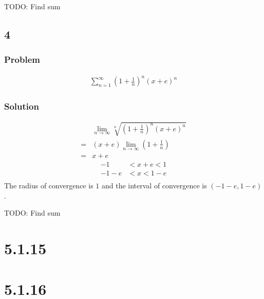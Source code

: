\documentclass[12pt]{article}
\newcommand{\round}[1]{\left(       #1 \right)      }
\begin{document}
TODO: Find sum


\subsection*{4}
\subsubsection*{Problem}
\begin{align*}
    \sum_{n=1}^\infty \round{1+\frac{1}{n}}^n (x+e)^n
\end{align*}

\subsubsection*{Solution}
\begin{align*}
     & \lim_{n\to\infty} \sqrt[n]{\round{1+\frac{1}{n}}^n (x+e)^n} \\
    =& (x+e) \lim_{n\to\infty} \round{1+\frac{1}{n}} \\
    =& x+e
\end{align*}
\begin{align*}
    -1 &< x+e < 1 \\
    -1-e &< x < 1-e \\
\end{align*}
The radius of convergence is $1$ and the interval of convergence is $(-1-e, 1-e)$.

TODO: Find sum


\section*{5.1.15}

\section*{5.1.16}
\end{document}
